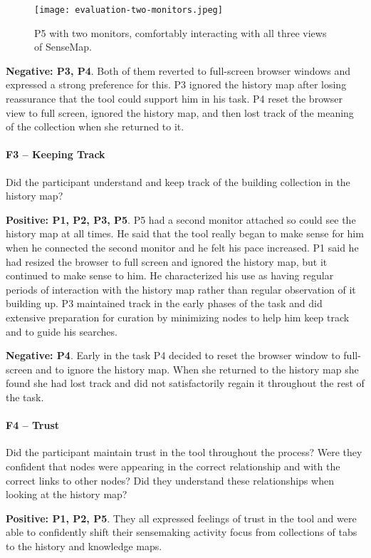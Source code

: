 \begin{figure}[!htb]
	\centering
	\texttt{[image: evaluation-two-monitors.jpeg]}
	\caption{P5 with two monitors, comfortably interacting with all three views of SenseMap.}
	\label{fig:evaluation-two-monitors}
\end{figure}

\textbf{Negative: P3, P4}. Both of them reverted to full-screen browser windows and expressed a strong preference for this. P3 ignored the history map after losing reassurance that the tool could support him in his task. P4 reset the browser view to full screen, ignored the history map, and then lost track of the meaning of the collection when she returned to it.

\paragraph{F3 -- Keeping Track}
Did the participant understand and keep track of the building collection in the history map?

\textbf{Positive: P1, P2, P3, P5}. P5 had a second monitor attached so could see the history map at all times. He said that the tool really began to make sense for him when he connected the second monitor and he felt his pace increased. P1 said he had resized the browser to full screen and ignored the history map, but it continued to make sense to him. He characterized his use as having regular periods of interaction with the history map rather than regular observation of it building up. P3 maintained track in the early phases of the task and did extensive preparation for curation by minimizing nodes to help him keep track and to guide his searches.

\textbf{Negative: P4}. Early in the task P4 decided to reset the browser window to full-screen and to ignore the history map. When she returned to the history map she found she had lost track and did not satisfactorily regain it throughout the rest of the task.

\paragraph{F4 -- Trust}
Did the participant maintain trust in the tool throughout the process? Were they confident that nodes were appearing in the correct relationship and with the correct links to other nodes? Did they understand these relationships when looking at the history map?

\textbf{Positive: P1, P2, P5}. They all expressed feelings of trust in the tool and were able to confidently shift their sensemaking activity focus from collections of tabs to the history and knowledge maps.

